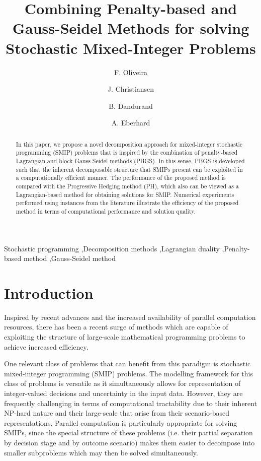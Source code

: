 \documentclass[preprint, 1p, review]{elsarticle}
\begin{document}
\begin{frontmatter}


\title{Combining Penalty-based and Gauss-Seidel Methods for solving Stochastic Mixed-Integer Problems}

\author{F. Oliveira}	
\author{J. Christiansen}
\author{B. Dandurand}
\author{A. Eberhard}


\address{Mathematical Sciences \\ School of Science - RMIT University}

\begin{abstract}
In this paper, we propose a novel decomposition approach for mixed-integer stochastic programming (SMIP) problems that is inspired by the combination of penalty-based Lagrangian and block Gauss-Seidel methods (PBGS). In this sense, PBGS is developed such that the inherent decomposable structure that SMIPs present can be exploited in a computationally efficient manner. The performance of the proposed method is compared with the Progressive Hedging method (PH), which also can be viewed as a Lagrangian-based method for obtaining solutions for SMIP. Numerical experiments performed using instances from the literature illustrate the efficiency of the proposed method in terms of computational performance and solution quality. 
\end{abstract}


\begin{keyword}
Stochastic programming \sep Decomposition methods \sep Lagrangian duality \sep Penalty-based method \sep Gauss-Seidel method 
\end{keyword}

\end{frontmatter}


\section{Introduction}

Inspired by recent advances and the increased availability of parallel computation resources, there has been a recent surge of methods which are capable of exploiting the structure of large-scale mathematical programming problems to achieve increased efficiency. 

One relevant class of problems that can benefit from this paradigm is stochastic mixed-integer programming (SMIP) problems. 
The modelling framework for this class of problems is versatile as it simultaneously allows for representation of integer-valued decisions and uncertainty in the input data.
However, they are frequently challenging in terms of computational tractability due to their inherent NP-hard nature and their large-scale that arise from their scenario-based representations. Parallel computation is particularly appropriate for solving SMIPs, since the special structure of these problems (i.e. their partial separation by decision stage and by outcome scenario) makes them easier to decompose into smaller subproblems which may then be solved simultaneously.
\end{document}
